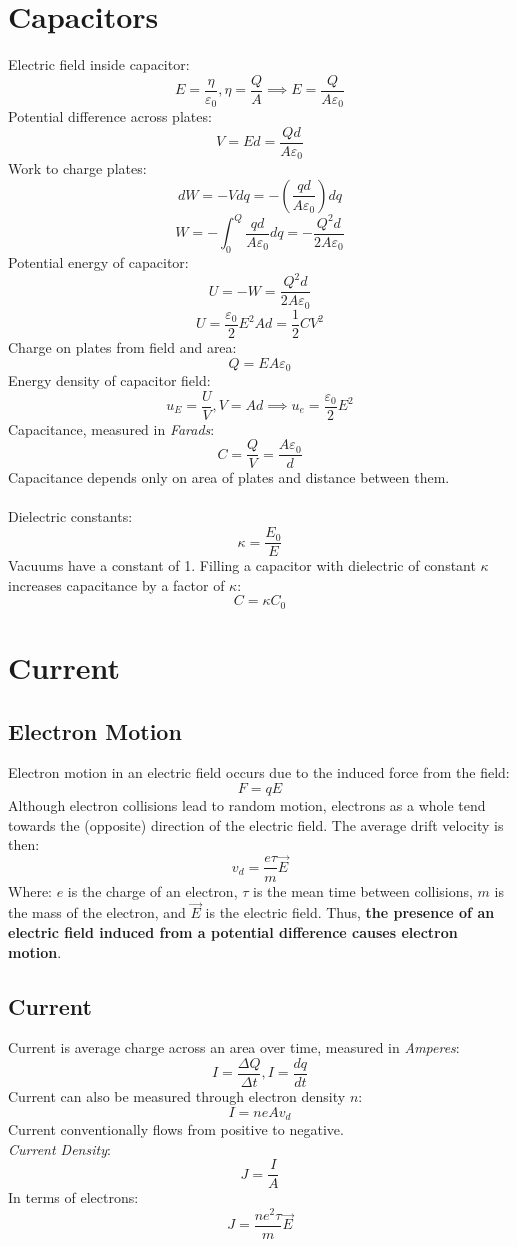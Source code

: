 \section{Capacitors}
Electric field inside capacitor:
$$E=\frac{\eta}{\varepsilon_0}, \eta=\frac{Q}{A}\implies E=\frac{Q}{A\varepsilon_0}$$
Potential difference across plates:
$$V=Ed=\frac{Qd}{A\varepsilon_0}$$
Work to charge plates:
$$dW=-Vdq=-(\frac{qd}{A\varepsilon_0})dq$$
$$W=-\int^Q_0\frac{qd}{A\varepsilon_0}dq=-\frac{Q^2d}{2A\varepsilon_0}$$
Potential energy of capacitor:
$$U=-W=\frac{Q^2d}{2A\varepsilon_0}$$
$$U=\frac{\varepsilon_0}{2}E^2Ad=\frac{1}{2}CV^2$$
Charge on plates from field and area:
$$Q=EA\varepsilon_0$$
Energy density of capacitor field:
$$u_E=\frac{U}{V},V=Ad\implies u_e=\frac{\varepsilon_0}{2}E^2$$
Capacitance, measured in \emph{Farads}:
$$C=\frac{Q}{V}=\frac{A\varepsilon_0}{d}$$
Capacitance depends only on area of plates and distance between them.\\\\
Dielectric constants:
$$\kappa=\frac{E_0}{E}$$
Vacuums have a constant of 1. Filling a capacitor with dielectric of constant $\kappa$ increases capacitance by a factor of $\kappa$:
$$C=\kappa C_0$$
\section{Current}
\subsection{Electron Motion}
Electron motion in an electric field occurs due to the induced force from the field:
$$F=qE$$
Although electron collisions lead to random motion, electrons as a whole tend towards the (opposite) direction of the electric field. The average drift velocity is then:
$$v_d=\frac{e\tau}{m}\vec{E}$$
Where: $e$ is the charge of an electron, $\tau$ is the mean time between collisions, $m$ is the mass of the electron, and $\vec{E}$ is the electric field.
Thus, \textbf{the presence of an electric field induced from a potential difference causes electron motion}.
\subsection{Current}
Current is average charge across an area over time, measured in \emph{Amperes}:
$$I=\frac{\Delta Q}{\Delta t}, I=\frac{dq}{dt}$$
Current can also be measured through electron density $n$:
$$I=neAv_d$$
Current conventionally flows from positive to negative.\\
\emph{Current Density}:
$$J=\frac{I}{A}$$
In terms of electrons:
$$J=\frac{ne^2\tau}{m}\vec{E}$$
